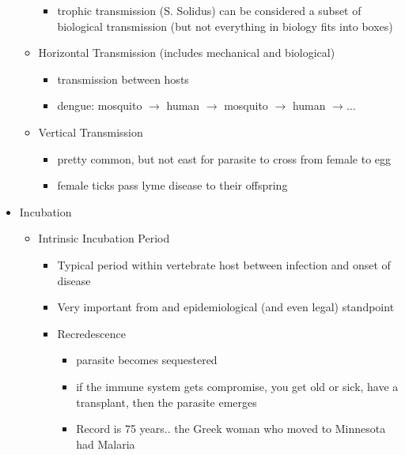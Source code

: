 \documentclass{article}
\begin{document}
\begin{itemize}
\begin{itemize}
\begin{itemize}
                        \item trophic transmission (S. Solidus) can be considered a subset of biological transmission (but not everything in biology fits into boxes)
                    \end{itemize}
                    \item Horizontal Transmission (includes mechanical and biological)
                    \begin{itemize}
                        \item transmission between hosts
                        \item dengue: mosquito $\rightarrow$ human $\rightarrow$ mosquito $\rightarrow$ human $\rightarrow \dots$
                    \end{itemize}
                    \item Vertical Transmission
                    \begin{itemize}
                        \item pretty common, but not east for parasite to cross from female to egg
                        \item female ticks pass lyme disease to their offspring
                    \end{itemize}
                \end{itemize}
                \item Incubation
                \begin{itemize}
                    \item Intrinsic Incubation Period
                    \begin{itemize}
                        \item Typical period within vertebrate host between infection and onset of disease
                        \item Very important from and epidemiological (and even legal) standpoint
                        \item Recredescence
                        \begin{itemize}
                            \item parasite becomes sequestered
                            \item if the immune system gets compromise, you get old or sick, have a transplant, then the parasite emerges
                            \item Record is 75 years.. the Greek woman who moved to Minnesota had Malaria
                        \end{itemize}

\end{itemize}
\end{itemize}
\end{itemize}
\end{document}

